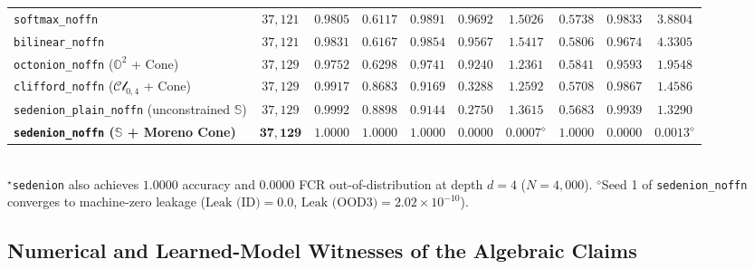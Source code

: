 \documentclass[11pt,a4paper]{article}
\theoremstyle{definition}
\theoremstyle{remark}
\newcommand{\Oc}{\mathbb{O}}
\newcommand{\Se}{\mathbb{S}}
\begin{document}
\begin{table}[t!]
{\begin{tabular}{@{}lccccccccc@{}}
\texttt{softmax\_noffn} & $37{,}121$ & $0.9805$ & $0.6117$ & $0.9891$ & $0.9692$ & $1.5026$ & $0.5738$ & $0.9833$ & $3.8804$ \\
\texttt{bilinear\_noffn} & $37{,}121$ & $0.9831$ & $0.6167$ & $0.9854$ & $0.9567$ & $1.5417$ & $0.5806$ & $0.9674$ & $4.3305$ \\
\texttt{octonion\_noffn} ($\Oc^2$ + Cone) & $37{,}129$ & $0.9752$ & $0.6298$ & $0.9741$ & $0.9240$ & $1.2361$ & $0.5841$ & $0.9593$ & $1.9548$ \\
\texttt{clifford\_noffn} ($\mathcal{Cl}_{0,4}$ + Cone) & $37{,}129$ & $0.9917$ & $0.8683$ & $0.9169$ & $0.3288$ & $1.2592$ & $0.5708$ & $0.9867$ & $1.4586$ \\
\texttt{sedenion\_plain\_noffn} (unconstrained $\Se$) & $37{,}129$ & $0.9992$ & $0.8898$ & $0.9144$ & $0.2750$ & $1.3615$ & $0.5683$ & $0.9939$ & $1.3290$ \\
\textbf{\texttt{sedenion\_noffn} ($\Se$ + Moreno Cone)} & $\mathbf{37{,}129}$ & $\mathbf{1.0000}$ & $\mathbf{1.0000}$ & $\mathbf{1.0000}$ & $\mathbf{0.0000}$ & $\mathbf{0.0007}^{\diamond}$ & $\mathbf{1.0000}$ & $\mathbf{0.0000}$ & $\mathbf{0.0013}^{\diamond}$ \\
\bottomrule
\end{tabular}}
\\[2pt]
{\footnotesize $^{\star}$\texttt{sedenion} also achieves $\mathbf{1.0000}$ accuracy and $\mathbf{0.0000}$ FCR out-of-distribution at depth $d = 4$ ($N = 4{,}000$). \quad $^{\diamond}$Seed 1 of \texttt{sedenion\_noffn} converges to machine-zero leakage ($\text{Leak (ID)} = 0.0$, $\text{Leak (OOD3)} = 2.02 \times 10^{-10}$).}
\end{table}

\subsection{Numerical and Learned-Model Witnesses of the Algebraic Claims}
\label{sec:witness}
\end{document}
